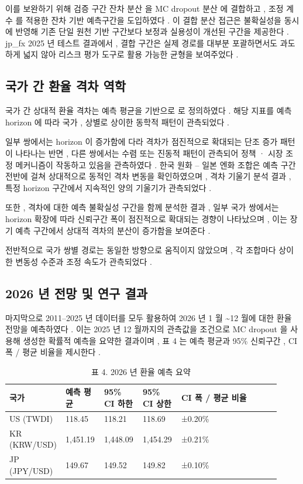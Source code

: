 \documentclass[10pt,a4paper]{article}
\begin{document}
이를 보완하기 위해 검증 구간 잔차 분산 을 MC dropout 분산 에 결합하고 , 조정 계수 를 적용한 잔차 기반 예측구간을 도입하였다 . 이 결합 분산 접근은 불확실성을 동시에 반영해 기존 단일 원천 기반 구간보다 보정과 실용성이 개선된 구간을 제공한다 . jp\_fx 2025 년 테스트 결과에서 , 결합 구간은 실제 경로를 대부분 포괄하면서도 과도하게 넓지 않아 리스크 평가 도구로 활용 가능한 균형을 보여주었다 .

\subsection{국가 간 환율 격차 역학}
국가 간 상대적 환율 격차는 예측 평균을 기반으로 로 정의하였다 . 해당 지표를 예측 horizon 에 따라 국가 , 상별로 상이한 동학적 패턴이 관측되었다 .

일부 쌍에서는 horizon 이 증가함에 다라 격차가 점진적으로 확대되는 단조 증가 패턴이 나타나는 반면 , 다른 쌍에서는 수렴 또는 진동적 패턴이 관측되어 정책 · 시장 조정 메커니즘이 작동하고 있음을 관측하였다 . 한국 원화 – 일본 엔화 조합은 예측 구간 전반에 걸쳐 상대적으로 동적인 격차 변동을 확인하였으며 , 격차 기울기 분석 결과 , 특정 horizon 구간에서 지속적인 양의 기울기가 관측되었다 .

또한 , 격차에 대한 예측 불확실성 구간을 함께 분석한 결과 , 일부 국가 쌍에서는 horizon 확장에 따라 신뢰구간 폭이 점진적으로 확대되는 경향이 나타났으며 , 이는 장기 예측 구간에서 상대적 격차의 분산이 증가함을 보여준다 .

전반적으로 국가 쌍별 경로는 동일한 방향으로 움직이지 않았으며 , 각 조합마다 상이한 변동성 수준과 조정 속도가 관측되었다 .

\subsection{2026 년 전망 및 연구 결과}
마지막으로 2011–2025 년 데이터를 모두 활용하여 2026 년 1 월 \textasciitilde{}12 월에 대한 환율 전망을 예측하였다 . 이는 2025 년 12 월까지의 관측값을 조건으로 MC dropout 을 사용해 생성한 확률적 예측을 요약한 결과이며 , 표 4 는 예측 평균과 95\% 신뢰구간 , CI 폭 / 평균 비율을 제시한다 .

\begingroup\small
\begin{table}[t]
\centering
\caption{표 4. 2026 년 환율 예측 요약}
\begin{tabular}{|p{0.14\linewidth}|p{0.14\linewidth}|p{0.14\linewidth}|p{0.14\linewidth}|p{0.36\linewidth}|}
\hline
 국가 & 예측 평균 & 95\% CI 하한 & 95\% CI 상한 & CI 폭 / 평균 비율 \\
\hline
 US (TWDI) & 118.45 & 118.21 & 118.69 & ±0.20\% \\
\hline
 KR (KRW/USD) & 1,451.19 & 1,448.09 & 1,454.29 & ±0.21\% \\
\hline
 JP (JPY/USD) & 149.67 & 149.52 & 149.82 & ±0.10\% \\
\hline
\end{tabular}
\end{table}
\endgroup
\end{document}
